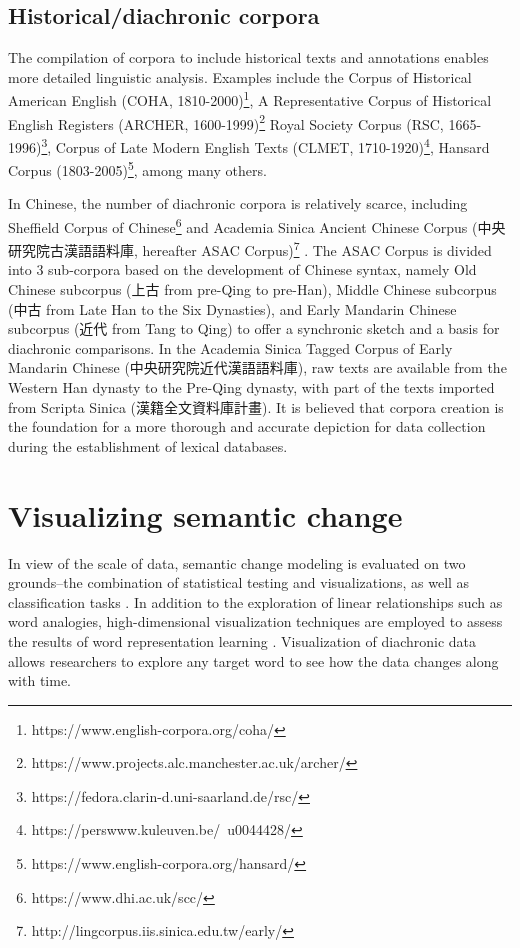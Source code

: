 \subsection{Historical/diachronic corpora}
The compilation of corpora to include historical texts and annotations enables more detailed linguistic analysis. Examples include
the Corpus of Historical American English (COHA, 1810-2000)\footnote{https://www.english-corpora.org/coha/}, 
A Representative Corpus of Historical English Registers (ARCHER, 1600-1999)\footnote{https://www.projects.alc.manchester.ac.uk/archer/}
Royal Society Corpus (RSC, 1665-1996)\footnote{https://fedora.clarin-d.uni-saarland.de/rsc/}, 
Corpus of Late Modern English Texts (CLMET, 1710-1920)\footnote{https://perswww.kuleuven.be/~u0044428/}, 
Hansard Corpus (1803-2005)\footnote{https://www.english-corpora.org/hansard/}, among many others.

In Chinese, the number of diachronic corpora is relatively scarce, including Sheffield Corpus of Chinese\footnote{https://www.dhi.ac.uk/scc/} and Academia Sinica Ancient Chinese Corpus (中央研究院古漢語語料庫, hereafter ASAC Corpus)\footnote{http://lingcorpus.iis.sinica.edu.tw/early/} \parencite{wei1997corpus}. The ASAC Corpus is divided into 3 sub-corpora based on the development of Chinese syntax, namely Old Chinese subcorpus (上古 from pre-Qing to pre-Han), Middle Chinese subcorpus (中古 from Late Han to the Six Dynasties), and Early Mandarin Chinese subcorpus (近代 from Tang to Qing) to offer a synchronic sketch and a basis for diachronic comparisons. In the Academia Sinica Tagged Corpus of Early Mandarin Chinese (中央研究院近代漢語語料庫), raw texts are available from the Western Han dynasty to the Pre-Qing dynasty, with part of the texts imported from Scripta Sinica (漢籍全文資料庫計畫). It is believed that corpora creation is the foundation for a more thorough and accurate depiction for data collection during the establishment of lexical databases.



\section{Visualizing semantic change}
In view of the scale of data, semantic change modeling is evaluated on two grounds--the combination of statistical testing and visualizations, as well as classification tasks \parencite{tang2018state}. In addition to the exploration of linear relationships such as word analogies, high-dimensional visualization techniques are employed to assess the results of word representation learning \parencite{liu2017visual}. Visualization of diachronic data allows researchers to explore any target word to see how the data changes along with time.

